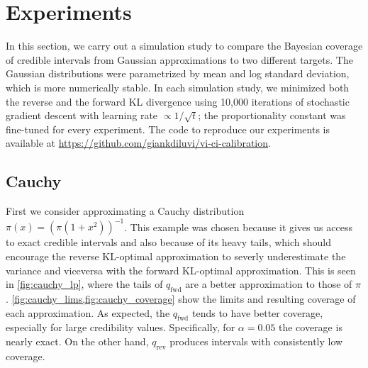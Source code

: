 \section{Experiments} \label{sec:experiments}

In this section,
we carry out a simulation study to compare
the Bayesian coverage of credible intervals
from Gaussian approximations to two different targets.
The Gaussian distributions were parametrized by mean
and log standard deviation,
which is more numerically stable.
In each simulation study,
we minimized both the reverse and the forward KL divergence
using 10,000 iterations of stochastic gradient descent
with learning rate $\propto 1/\sqrt{t}$;
the proportionality constant was fine-tuned for every experiment.
The code to reproduce our experiments is available at
\url{https://github.com/giankdiluvi/vi-ci-calibration}.


\subsection{Cauchy} \label{subsec:cauchy}

First we consider approximating a Cauchy distribution
$\pi(x)=(\pi(1+x^2))^{-1}$.
This example was chosen because it gives us access to exact
credible intervals and also because of its heavy tails,
which should encourage the reverse KL-optimal
approximation to severly underestimate the variance
and viceversa with the forward KL-optimal approximation.
This is seen in \cref{fig:cauchy_lp},
where the tails of $q_\mathrm{fwd}$ are a better
approximation to those of $\pi$.
\cref{fig:cauchy_lims,fig:cauchy_coverage}
show the limits and resulting coverage of each approximation.
As expected, the $q_\mathrm{fwd}$ tends to have better coverage,
especially for large credibility values.
Specifically, for $\alpha=0.05$
the coverage is nearly exact.
On the other hand, $q_\mathrm{rev}$ produces
intervals with consistently low coverage.

